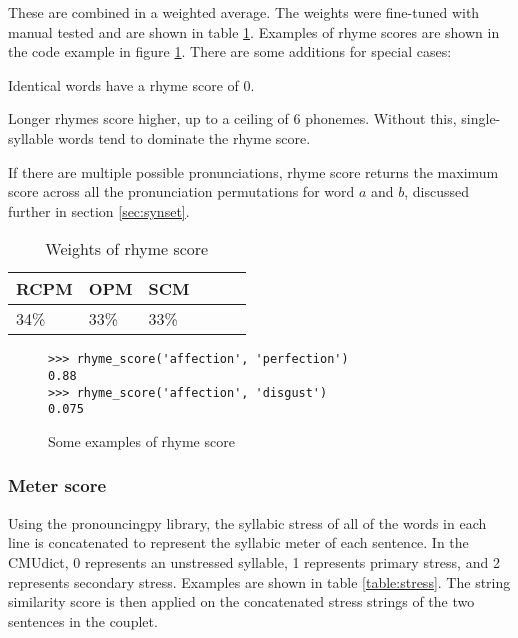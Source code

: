 \documentclass[11pt,a4paper]{article}
\newenvironment{tight_enumerate}{
\begin{enumerate}
\setlength{\itemsep}{0pt}
\setlength{\parskip}{0pt}
}{\end{enumerate}}
\begin{document}
These are combined in a weighted average. The weights were fine-tuned with manual tested and are shown in table \ref{table:weight_rhyme_score}. Examples of rhyme scores are shown in the code example in figure \ref{fig:rhymescorecode}. There are some additions for special cases:
\begin{tight_enumerate}
	\vspace{-0.5em}
	\item
		Identical words have a rhyme score of 0.
	\item
		Longer rhymes score higher, up to a ceiling of 6 phonemes. Without this, single-syllable words tend to dominate the rhyme score.
	\item
		If there are multiple possible pronunciations, rhyme score returns the maximum score across all the pronunciation permutations for word $a$ and $b$, discussed further in section \ref{sec:synset}.
\end{tight_enumerate}

\begin{table}[ht]
\centering
\begin{tabular}{lll c c c}
	\hline\hline
	RCPM & OPM & SCM \\ [0.5ex]
	\hline\hline
	34\% & 33\% & 33\% \\ [0.5ex]
	\hline
\end{tabular}
\caption{Weights of rhyme score}
\label{table:weight_rhyme_score}
\end{table}

\begin{figure}
\begin{Verbatim}[fontsize=\small]
>>> rhyme_score('affection', 'perfection')
0.88
>>> rhyme_score('affection', 'disgust')
0.075
\end{Verbatim}
\caption{Some examples of rhyme score}
\label{fig:rhymescorecode}
\end{figure}

\subsubsection{Meter score}
\label{sec:stressscore}

Using the pronouncingpy library, the syllabic stress of all of the words in each line is concatenated to represent the syllabic meter \cite{meter_def} of each sentence. In the CMUdict, 0 represents an unstressed syllable, 1 represents primary stress, and 2 represents secondary stress.  Examples are shown in table \ref{table:stress}. The \citet{ratcliff} string similarity score is then applied on the concatenated stress strings of the two sentences in the couplet.
\end{document}
